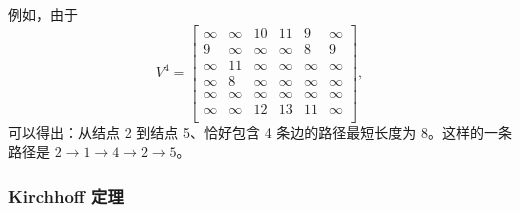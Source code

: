 例如，由于
\[
V^4= \begin{bmatrix}
  \infty & \infty & 10 & 11 & 9 & \infty \\
  9 & \infty & \infty & \infty & 8 & 9 \\
  \infty & 11 & \infty & \infty & \infty & \infty \\
  \infty & 8 & \infty & \infty & \infty & \infty \\
  \infty & \infty & \infty & \infty & \infty & \infty \\
  \infty & \infty & 12 & 13 & 11 & \infty \\
 \end{bmatrix},
\]
可以得出：从结点 2 到结点 5、恰好包含 4 条边的路径最短长度为 8。这样的一条路径是 $2 \rightarrow 1 \rightarrow 4 \rightarrow 2 \rightarrow 5$。

\subsubsection{Kirchhoff 定理}


